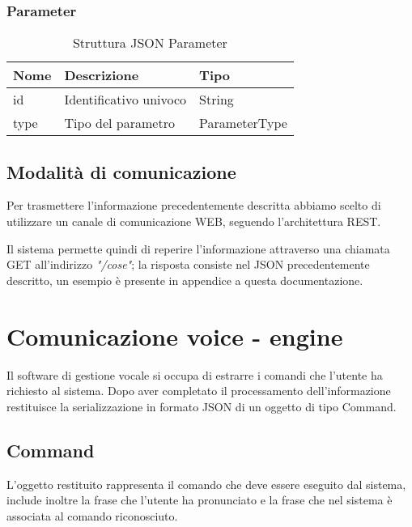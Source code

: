 \documentclass[twoside]{supsistudent}
\begin{document}
\subsection{Parameter}
\begin{table}[H]
\centering
\caption{Struttura JSON Parameter}
\label{Struttura JSON Parameter}
\begin{tabular}{@{}|l|l|l|@{}}
\toprule
Nome & Descrizione            & Tipo          \\ \midrule
id   & Identificativo univoco & String        \\ \midrule
type & Tipo del parametro     & ParameterType \\ \bottomrule
\end{tabular}
\end{table}
\section{Modalità di comunicazione}
Per trasmettere l'informazione precedentemente descritta abbiamo scelto di utilizzare un canale di comunicazione WEB, seguendo l'architettura REST.\cite{rest}

Il sistema permette quindi di reperire l'informazione attraverso una chiamata GET all'indirizzo \textit{"/cose"}; la risposta consiste nel JSON precedentemente descritto, un esempio è presente in appendice a questa documentazione.
\chapter{Comunicazione voice - engine }
Il software di gestione vocale si occupa di estrarre i comandi che l'utente ha richiesto al sistema. Dopo aver completato il processamento dell'informazione restituisce la serializzazione in formato JSON di un oggetto di tipo Command.
\section{Command}
L'oggetto restituito rappresenta il comando che deve essere eseguito dal sistema, include inoltre la frase che l'utente ha pronunciato e la frase che nel sistema è associata al comando riconosciuto.
\end{document}
